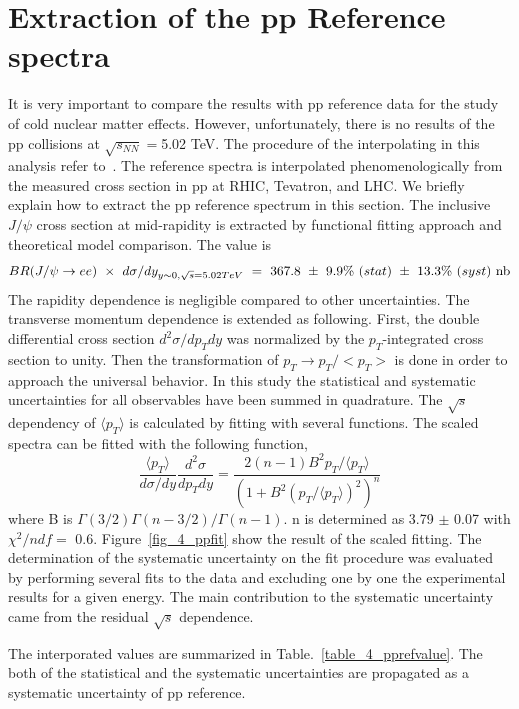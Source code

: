 \section{Extraction of the pp Reference spectra}
\label{sec_4_ppref}
It is very important to compare the results with pp reference data for the study of cold nuclear matter effects. 
However, unfortunately, there is no results of the pp collisions at $\sqrt{s_{NN}} =$5.02 TeV.
The procedure of the interpolating in this analysis refer to~\cite{bib_jpsippref}.
The reference spectra is interpolated phenomenologically from the measured cross section in pp at RHIC, Tevatron, and LHC.
We briefly explain how to extract the pp reference spectrum in this section. 
The inclusive $J/\psi$ cross section at mid-rapidity is extracted by functional fitting approach and theoretical model comparison. 
The value is
\begin{equation}
  BR(J/\psi\rightarrow ee)~\times ~d\sigma/dy_{y\sim0, \sqrt{s}=5.02TeV}~=~367.8~\pm~9.9\%~(stat)~\pm~ 13.3\% ~(syst) ~\rm{nb}
\end{equation}  
The rapidity dependence is negligible compared to other uncertainties. 
The transverse momentum dependence is extended as following. 
First, the  double differential cross section $d^{2}\sigma/dp_{T}dy$ was normalized by the $p_{T}$-integrated cross section to unity. 
Then the transformation of $p_{T} \rightarrow p_{T}/<p_{T}>$ is done in order to approach the universal behavior. 
In this study the statistical and systematic uncertainties for all observables have been summed in quadrature.
The $\sqrt{s}$ dependency of $\langle p_{T}\rangle$ is calculated by fitting with several functions. 
The scaled spectra can be fitted with the following function, 
\begin{equation}
  \frac{\langle p_{T}\rangle}{d\sigma/dy}\frac{d^{2}\sigma}{dp_{T}dy} = \frac{2(n-1)B^{2}p_{T}/\langle p_{T}\rangle }{(1+B^{2}(p_{T}/\langle p_{T}\rangle)^{2})^{n}}
\end{equation}
where B is $\Gamma(3/2)\Gamma(n-3/2)/\Gamma(n-1)$. 
n is determined as 3.79 $\pm$ 0.07 with $\chi^{2}/ndf=$ 0.6.
Figure~\ref{fig_4_ppfit} show the result of the scaled fitting. 
The determination of the systematic uncertainty on the fit procedure was evaluated by performing several fits to the data and excluding one by one the experimental results for a given energy. 
The main contribution to the systematic uncertainty came from the residual $\sqrt{s}$ dependence.

The interporated values are summarized in Table.~\ref{table_4_pprefvalue}.
The both of the statistical and the systematic uncertainties are propagated as a systematic uncertainty of pp reference. 


